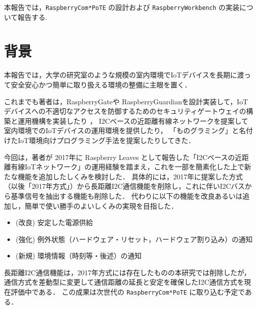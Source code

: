 本報告では，{\tt Raspberry\-Com*PoTE} の設計および {\tt Raspberry\-Workbench} の実装について報告する.


\section{背景}
\label{sec:02background}

本報告では，大学の研究室のような規模の室内環境でIoTデバイスを長期に渡って安全安心かつ簡単に取り扱える環境の整備に主眼を置く．

これまでも著者は，RaspberryGateや RaspberryGuardianを設計実装して，IoTデバイスへの不適切なアクセスを防御するためのセキュリティゲートウェイの構築と運用機構を実装したり\cite{hohno:RaspberryGate}\cite{hohno:RaspberryGuardian} ，
I2Cベースの近距離有線ネットワークを提案して室内環境でのIoTデバイスの運用環境を提供したり\cite{hohno:I2CwiredLAN-2017}，
「ものグラミング」と名付けたIoT環境向けプログラミング手法を提案したりしてきた\cite{hohno:monogramming2}．

今回は，著者が 2017年に Raspberry Leaves として報告した「I2Cベースの近距離有線IoTネットワーク」の運用経験を踏まえ，これを一部を簡素化した上で新たな機能を追加したしくみを検討した．
具体的には，2017年に提案した方式（以後「2017年方式」）から長距離I2C通信機能を削除し，これに伴いI2Cバスから基準信号を抽出する機能も削除した．
代わりに以下の機能を改良あるいは追加し，簡単で使い勝手のよいしくみの実現を目指した．

\begin{itemize}
\item (改良) 安定した電源供給
\item (強化) 例外状態（ハードウェア・リセット，ハードウェア割り込み）の通知
\item (新規) 環境情報（時刻等・後述）の通知
\end{itemize}

長距離I2C通信機能は，2017年方式には存在したものの本研究では削除したが，通信方式を差動型に変更して通信距離の延長と安定を確保したI2C通信方式を現在評価中である．
この成果は次世代の {\tt Raspberry\-Com*PoTE} に取り込む予定である．

